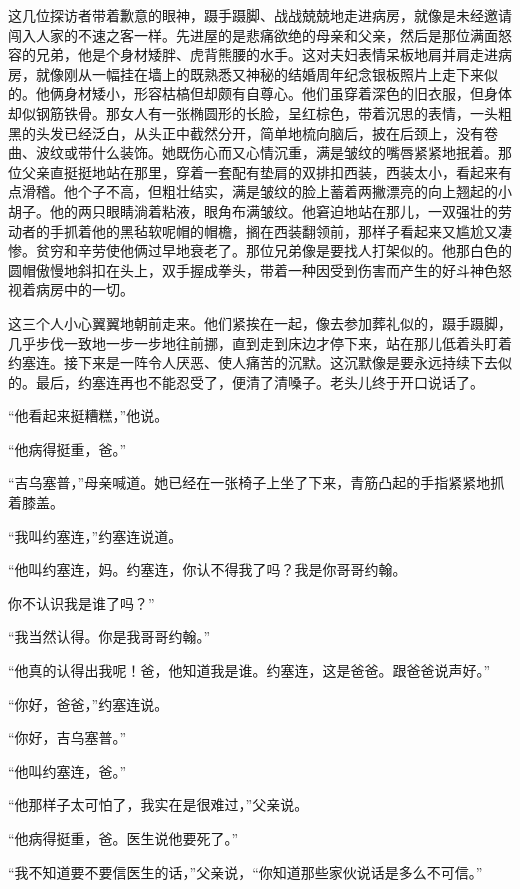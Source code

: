     这几位探访者带着歉意的眼神，蹑手蹑脚、战战兢兢地走进病房，就像是未经邀请闯入人家的不速之客一样。先进屋的是悲痛欲绝的母亲和父亲，然后是那位满面怒容的兄弟，他是个身材矮胖、虎背熊腰的水手。这对夫妇表情呆板地肩并肩走进病房，就像刚从一幅挂在墙上的既熟悉又神秘的结婚周年纪念银板照片上走下来似的。他俩身材矮小，形容枯槁但却颇有自尊心。他们虽穿着深色的旧衣服，但身体却似钢筋铁骨。那女人有一张椭圆形的长脸，呈红棕色，带着沉思的表情，一头粗黑的头发已经泛白，从头正中截然分开，简单地梳向脑后，披在后颈上，没有卷曲、波纹或带什么装饰。她既伤心而又心情沉重，满是皱纹的嘴唇紧紧地抿着。那位父亲直挺挺地站在那里，穿着一套配有垫肩的双排扣西装，西装太小，看起来有点滑稽。他个子不高，但粗壮结实，满是皱纹的脸上蓄着两撇漂亮的向上翘起的小胡子。他的两只眼睛淌着粘液，眼角布满皱纹。他窘迫地站在那儿，一双强壮的劳动者的手抓着他的黑毡软呢帽的帽檐，搁在西装翻领前，那样子看起来又尴尬又凄惨。贫穷和辛劳使他俩过早地衰老了。那位兄弟像是要找人打架似的。他那白色的圆帽傲慢地斜扣在头上，双手握成拳头，带着一种因受到伤害而产生的好斗神色怒视着病房中的一切。
 


    这三个人小心翼翼地朝前走来。他们紧挨在一起，像去参加葬礼似的，蹑手蹑脚，几乎步伐一致地一步一步地往前挪，直到走到床边才停下来，站在那儿低着头盯着约塞连。接下来是一阵令人厌恶、使人痛苦的沉默。这沉默像是要永远持续下去似的。最后，约塞连再也不能忍受了，便清了清嗓子。老头儿终于开口说话了。

    “他看起来挺糟糕，”他说。

    “他病得挺重，爸。”

    “吉乌塞普，”母亲喊道。她已经在一张椅子上坐了下来，青筋凸起的手指紧紧地抓着膝盖。

    “我叫约塞连，”约塞连说道。

    “他叫约塞连，妈。约塞连，你认不得我了吗？我是你哥哥约翰。

    你不认识我是谁了吗？”

    “我当然认得。你是我哥哥约翰。”

    “他真的认得出我呢！爸，他知道我是谁。约塞连，这是爸爸。跟爸爸说声好。”

    “你好，爸爸，”约塞连说。

    “你好，吉乌塞普。”

    “他叫约塞连，爸。”

    “他那样子太可怕了，我实在是很难过，”父亲说。

    “他病得挺重，爸。医生说他要死了。”

    “我不知道要不要信医生的话，”父亲说，“你知道那些家伙说话是多么不可信。”

